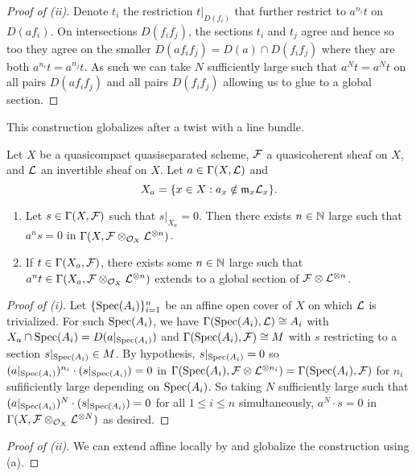 \begin{proof}[Proof of (ii)]
    Denote $t_{i}$ the restriction $t|_{D(f_{i})}$ that further restrict to $a^{n_{i}}t$ on $D(af_{i})$. On intersections $D(f_{i}f_{j})$, the sections $t_{i}$ and $t_{j}$ agree and hence so too they agree on the smaller $D(af_{i}f_{j})=D(a)\cap D(f_{i}f_{j})$ where they are both $a^{n_{i}}t=a^{n_{j}}t$. As such we can take $N$ sufficiently large such that $a^{N}t=a^{N}t$ on all pairs $D(af_{i}f_{j})$ and all pairs $D(f_{i}f_{j})$ allowing us to glue to a global section. 
\end{proof}
This construction globalizes after a twist with a line bundle. 
\begin{lemma}\label{lem: line bundle cohomololgy on qc schemes}
    Let $X$ be a quasicompact quasiseparated scheme, $\mathcal{F}$ a quasicoherent sheaf on $X$, and $\mathcal{L}$ an invertible sheaf on $X$. Let $a\in\Gamma(X,\mathcal{L})$ and 
    $$X_{a}=\{x\in X:a_{x}\notin\mathfrak{m}_{x}\mathcal{L}_{x}\}.$$
    \begin{enumerate}[label=(\roman*)]
        \item Let $s\in\Gamma(X,\mathcal{F})$ such that $s|_{X_{a}}=0$. Then there exists $n\in\mathbb{N}$ large such that $a^{n}s=0$ in $\Gamma(X,\mathcal{F}\otimes_{\mathcal{O}_{X}} \mathcal{L}^{\otimes n})$. 
        \item If $t\in\Gamma(X_{a},\mathcal{F})$, there exists some $n\in\mathbb{N}$ large such that  $a^{n}t\in\Gamma(X_{a},\mathcal{F}\otimes_{\mathcal{O}_{X}}\mathcal{L}^{\otimes n})$ extends to a global section of $\mathcal{F}\otimes\mathcal{L}^{\otimes n}$. 
    \end{enumerate}
\end{lemma}
\begin{proof}[Proof of (i)]
    Let $\{\operatorname{Spec}(A_{i})\}_{i=1}^{n}$ be an affine open cover of $X$ on which $\mathcal{L}$ is trivialized. For such $\operatorname{Spec}(A_{i})$, we have $\Gamma(\operatorname{Spec}(A_{i}),\mathcal{L})\cong A_{i}$ with $X_{a}\cap\operatorname{Spec}(A_{i})=D(a|_{\operatorname{Spec}(A_{i})})$ and $\Gamma(\operatorname{Spec}(A_{i}),\mathcal{F})\cong M$ with $s$ restricting to a section $s|_{\operatorname{Spec}(A_{i})}\in M$. By hypothesis, $s|_{\operatorname{Spec}(A_{i})}=0$ so $(a|_{\operatorname{Spec}(A_{i})})^{n_{i}}\cdot(s|_{\operatorname{Spec}(A_{i})})=0$ in $\Gamma(\operatorname{Spec}(A_{i}),\mathcal{F}\otimes\mathcal{L}^{\otimes n_{i}})=\Gamma(\operatorname{Spec}(A_{i}),\mathcal{F})$ for $n_{i}$ sufificiently large depending on $\operatorname{Spec}(A_{i})$. So taking $N$ sufficiently large such that $(a|_{\operatorname{Spec}(A_{i})})^{N}\cdot(s|_{\operatorname{Spec}(A_{i})})=0$ for all $1\leq i\leq n$ simultaneously, $a^{N}\cdot s=0$ in $\Gamma(X,\mathcal{F}\otimes_{\mathcal{O}_{X}}\mathcal{L}^{\otimes N})$ as desired. 
\end{proof}
\begin{proof}[Proof of (ii)]
    We can extend affine locally by  and globalize the construction using (a). 
\end{proof}
